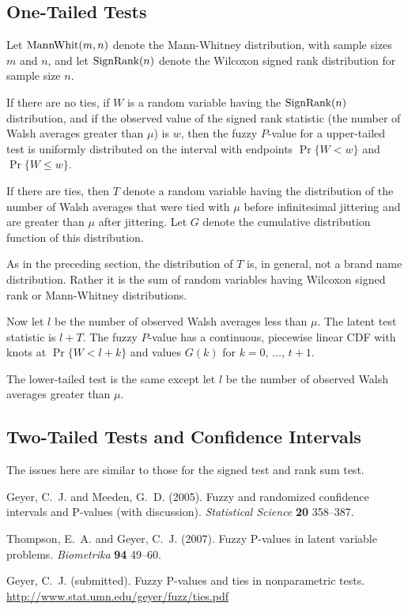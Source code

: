 \documentclass{article}
\newcommand{\MannWhitneyDis}{\text{\upshape MannWhit}}
\newcommand{\SignRankDis}{\text{\upshape SignRank}}
\begin{document}
\subsection{One-Tailed Tests}

Let $\MannWhitneyDis(m, n)$ denote the Mann-Whitney distribution,
with sample sizes $m$ and $n$, and let $\SignRankDis(n)$ denote
the Wilcoxon signed rank distribution for sample size $n$.

If there are no ties, if $W$ is a random variable having
the $\SignRankDis(n)$ distribution, and if the observed value
of the signed rank statistic (the number of Walsh averages greater than $\mu$)
is $w$, then the fuzzy $P$-value for a upper-tailed test is uniformly
distributed on the interval with endpoints $\Pr\{ W < w \}$
and $\Pr \{ W \le w \}$.

If there are ties, then $T$ denote a random variable having the distribution
of the number of Walsh averages that were tied with $\mu$ before infinitesimal
jittering and are greater than $\mu$ after jittering.  Let $G$ denote
the cumulative distribution function of this distribution.

As in the preceding section, the distribution of $T$ is, in general, not
a brand name distribution.  Rather it is the sum of random variables
having Wilcoxon signed rank or Mann-Whitney distributions.

Now let $l$ be the number of observed Walsh averages less than $\mu$.
The latent test
statistic is $l + T$.  The fuzzy $P$-value has a continuous, piecewise linear
CDF with knots at $\Pr\{ W < l + k \}$ and values $G(k)$
for $k = 0$, $\ldots$, $t + 1$.

The lower-tailed test is the same except let $l$ be the number of observed
Walsh averages greater than $\mu$.

\subsection{Two-Tailed Tests and Confidence Intervals}

The issues here are similar to those for the signed test and rank sum test.

\begin{thebibliography}{}

Geyer, C.~J. and Meeden, G.~D. (2005).
\newblock Fuzzy and randomized confidence intervals and P-values
    (with discussion).
\newblock \emph{Statistical Science} \textbf{20} 358--387.

Thompson, E.~A. and Geyer, C.~J. (2007).
\newblock Fuzzy P-values in latent variable problems.
\newblock \emph{Biometrika} \textbf{94} 49--60.

Geyer, C.~J. (submitted).
\newblock  Fuzzy P-values and ties in nonparametric tests.
\newblock  \url{http://www.stat.umn.edu/geyer/fuzz/ties.pdf}

\end{thebibliography}
\end{document}
